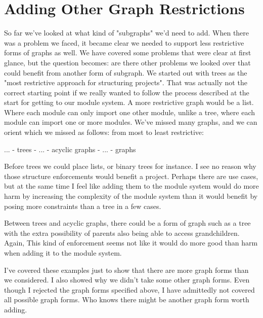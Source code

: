\documentclass{article}
\begin{document}
\section{Adding Other Graph Restrictions}

So far we've looked at what kind of "subgraphs" we'd need to add. When there was a problem we faced, it became clear we needed to support less restrictive forms of graphs as well. We have covered some problems that were clear at first glance, but the question becomes: are there other problems we looked over that could benefit from another form of subgraph. We started out with trees as the "most restrictive approach for structuring projects". That was actually not the correct starting point if we really wanted to follow the process described at the start for getting to our module system. A more restrictive graph would be a list. Where each module can only import one other module, unlike a tree, where each module can import one or more modules. We've missed many graphs, and we can orient which we missed as follows:
from most to least restrictive:

... - trees - ... - acyclic graphs - ... - graphs

Before trees we could place lists, or binary trees for instance. I see no reason why those structure enforcements would benefit a project. Perhaps there are use cases, but at the same time I feel like adding them to the module system would do more harm by increasing the complexity of the module system than it would benefit by posing more constraints than a tree in a few cases.

Between trees and acyclic graphs, there could be a form of graph such as a tree with the extra possibility of parents also being able to access grandchildren. Again, This kind of enforcement seems not like it would do more good than harm when adding it to the module system.


I've covered these examples just to show that there are more graph forms than we considered. I also showed why we didn't take some other graph forms. Even though I rejected the graph forms specified above, I have admittedly not covered all possible graph forms. Who knows there might be another graph form worth adding.


\end{document}
